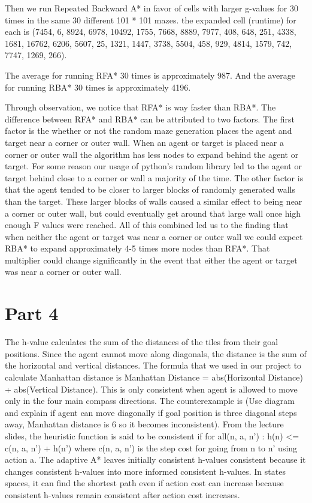 \documentclass{article}
\begin{document}
Then we run Repeated Backward A* in favor of cells with larger g-values for 30 times in the same 30 different 101 * 101 mazes. the expanded cell (runtime) for each is 
(7454, 6, 8924, 6978, 10492, 1755, 7668, 8889, 7977, 408, 648, 251, 4338, 1681, 16762, 6206, 5607, 25, 1321, 1447, 3738, 5504, 458, 929, 4814, 1579, 742, 7747, 1269, 266).

The average for running RFA* 30 times is approximately 987. And the average for running RBA* 30 times is approximately 4196.

Through observation, we notice that RFA* is way faster than RBA*. The difference between RFA* and RBA* can be attributed to two factors. The first factor is the whether or not the random maze generation places the agent and target near a corner or outer wall. When an agent or target is placed near a corner or outer wall the algorithm has less nodes to expand behind the agent or target. For some reason our usage of python's random library led to the agent or target behind close to a corner or wall a majority of the time. The other factor is that the agent tended to be closer to larger blocks of randomly generated walls than the target. These larger blocks of walls caused a similar effect to being near a corner or outer wall, but could eventually get around that large wall once high enough F values were reached. All of this combined led us to the finding that when neither the agent or target was near a corner or outer wall we could expect RBA* to expand approximately 4-5 times more nodes than RFA*. That multiplier could change significantly in the event that either the agent or target was near a corner or outer wall.

\section*{Part 4}
\hspace{5mm}
The h-value calculates the sum of the distances of the tiles from their goal positions. Since the agent cannot move along diagonals, the distance is the sum of the horizontal and vertical distances. The formula that we used in our project to calculate Manhattan distance is Manhattan Distance = abs(Horizontal Distance) + abs(Vertical Distance). This is only consistent when agent is allowed to move only in the four main compass directions. The counterexample is (Use diagram and explain if agent can move diagonally if goal position is three diagonal steps away, Manhattan distance is 6 so it becomes inconsistent).
From the lecture slides, the heuristic function is said to be consistent if
        for all(n, a, n’) : h(n) <= c(n, a, n’) + h(n’)
where c(n, a, n’) is the step cost for going from n to n’ using action a.
The adaptive A* leaves initially consistent h-values consistent because it changes consistent h-values into more informed consistent h-values. In states spaces, it can find the shortest path even if action cost can increase because consistent h-values remain consistent after action cost increases.
\end{document}
